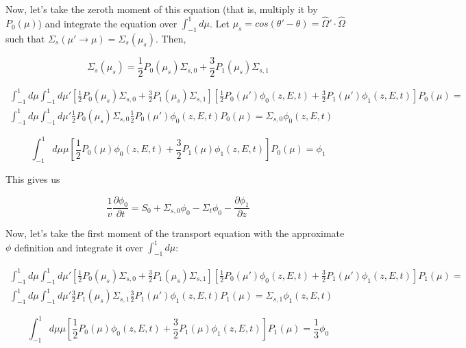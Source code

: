 \documentclass[12pt]{article}
\newcommand{\omvec}{\ensuremath{\hat{\Omega}}}
\newcommand{\sigso}{\ensuremath{\Sigma_{s,0}}}
\newcommand{\sigsi}{\ensuremath{\Sigma_{s,1}}}
\begin{document}
Now, let's take the zeroth moment of this equation (that is, multiply it by $P_0(\mu)$) and integrate the
equation over $\int_{-1}^{1}d\mu$. Let $\mu_s = cos(\theta'-\theta) = \omvec'\cdot\omvec$ such that
$\Sigma_s(\mu'\rightarrow\mu) = \Sigma_s(\mu_s)$. Then,

\begin{equation*}
\Sigma_s(\mu_s) = \frac{1}{2}P_0(\mu_s)\sigso + \frac{3}{2}P_1(\mu_s)\sigsi
\end{equation*}

\begin{multline*}
\int_{-1}^{1}d\mu\int_{-1}^{1}d\mu'\left[\frac{1}{2}P_0(\mu_s)\sigso+\frac{3}{2}P_1(\mu_s)\sigsi\right]
\left[\frac{1}{2}P_0(\mu')\phi_0(z,E,t)+\frac{3}{2}P_1(\mu')\phi_1(z,E,t)\right]P_0(\mu) = \\
\int_{-1}^{1}d\mu\int_{-1}^{1}d\mu'\frac{1}{2}P_0(\mu_s)\sigso\frac{1}{2}P_0(\mu')\phi_0(z,E,t)P_0(\mu) =
\sigso\phi_0(z,E,t)
\end{multline*}

\begin{equation*}
\int_{-1}^{1}d\mu\mu\left[\frac{1}{2}P_0(\mu)\phi_0(z,E,t)+\frac{3}{2}P_1(\mu)\phi_1(z,E,t)\right]P_0(\mu)
= \phi_1
\end{equation*}

This gives us

\begin{equation*}
\frac{1}{v}\frac{\partial\phi_0}{\partial t} = S_0 + \sigso\phi_0 - \Sigma_t\phi_0 - 
\frac{\partial\phi_1}{\partial z}
\end{equation*}

Now, let's take the first moment of the transport equation with the approximate $\phi$ definition and 
integrate it over $\int_{-1}^{1}d\mu$:

\begin{multline*}
\int_{-1}^{1}d\mu\int_{-1}^{1}d\mu'\left[\frac{1}{2}P_0(\mu_s)\sigso+\frac{3}{2}P_1(\mu_s)\sigsi\right]
\left[\frac{1}{2}P_0(\mu')\phi_0(z,E,t)+\frac{3}{2}P_1(\mu')\phi_1(z,E,t)\right]P_1(\mu) = \\
\int_{-1}^{1}d\mu\int_{-1}^{1}d\mu'\frac{3}{2}P_1(\mu_s)\sigsi\frac{3}{2}P_1(\mu')\phi_1(z,E,t)P_1(\mu) =
\sigsi\phi_1(z,E,t)
\end{multline*}

\begin{equation*}
\int_{-1}^{1}d\mu\mu\left[\frac{1}{2}P_0(\mu)\phi_0(z,E,t)+\frac{3}{2}P_1(\mu)\phi_1(z,E,t)\right]P_1(\mu)
= \frac{1}{3}\phi_0
\end{equation*}
\end{document}
